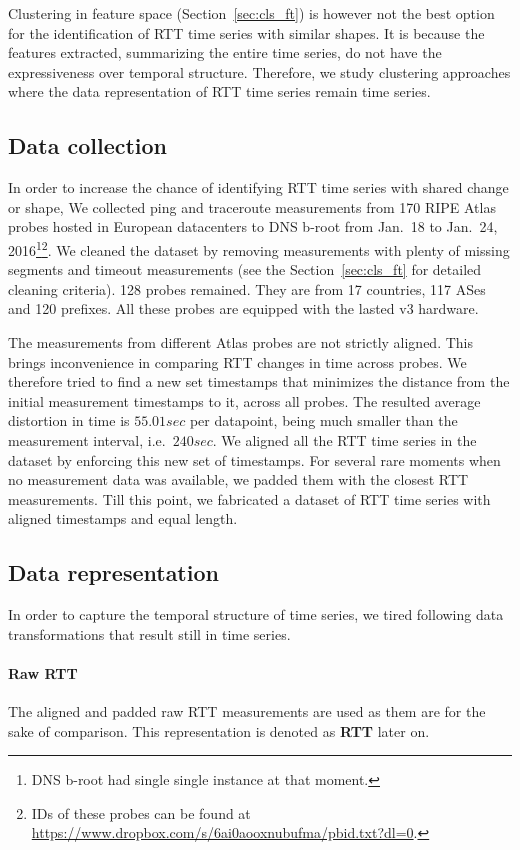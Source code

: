 Clustering in feature space (Section~\ref{sec:cls_ft}) is however not the best option for the identification of RTT time series with similar shapes.
It is because the features extracted, summarizing the entire time series, do not have the expressiveness over temporal structure.
Therefore, we study clustering approaches where the data representation of RTT time series remain time series.

\subsection{Data collection}
In order to increase the chance of identifying RTT time series with shared change or shape, We collected ping and traceroute measurements from 170 RIPE Atlas probes hosted in European datacenters to DNS b-root from Jan.\ 18 to Jan.\ 24, 2016\footnote{DNS b-root had single single instance at that moment.}\footnote{IDs of these probes can be found at \url{https://www.dropbox.com/s/6ai0aooxnubufma/pbid.txt?dl=0}.}.
We cleaned the dataset by removing measurements with plenty of missing segments and timeout measurements (see the Section~\ref{sec:cls_ft} for detailed cleaning criteria).
128 probes remained. They are from 17 countries, 117 ASes and 120 prefixes. All these probes are equipped with the lasted v3 hardware.

The measurements from different Atlas probes are not strictly aligned.
This brings inconvenience in comparing RTT changes in time across probes. 
We therefore tried to find a new set timestamps that minimizes the distance from the initial measurement timestamps to it, across all probes.
The resulted average distortion in time is $55.01 sec$ per datapoint, being much smaller than the measurement interval, i.e.\ $240 sec$.
We aligned all the RTT time series in the dataset by enforcing this new set of timestamps.
For several rare moments when no measurement data was available, we padded them with the closest RTT measurements.
Till this point, we fabricated a dataset of RTT time series with aligned timestamps and equal length.

\subsection{Data representation}
In order to capture the temporal structure of time series, we tired following data transformations that result still in time series.

\paragraph*{Raw RTT}  The aligned and padded raw RTT measurements are used as them are for the sake of comparison. This representation is denoted as \textbf{RTT} later on.

